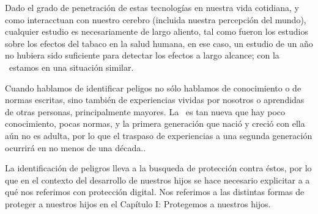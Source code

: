 Dado el grado de penetraci\'on de estas tecnolog\'ias en nuestra vida cotidiana, 
y como interacctuan con nuestro cerebro 
(incluida nuestra percepci\'on del mundo), cualquier estudio
es necesariamente de largo aliento, tal como fueron los estudios sobre
los efectos del tabaco en la salud humana, en ese caso, un estudio de
un a\~no no hubiera sido suficiente para detectar los efectos a largo alcance;
con la \internet\ estamos en una situaci\'on similar.

Cuando hablamos de identificar peligos no s\'olo hablamos de conocimiento
o de normas escritas, sino tambi\'en de experiencias vividas por nosotros 
o aprendidas de otras personas, principalmente mayores. 
La \internet\ es tan nueva que
hay poco conocimiento, pocas normas, y
 la primera generaci\'on que naci\'o
y creci\'o con ella a\'un no es adulta, por lo que el traspaso de experiencias 
a una segunda generaci\'on ocurrir\'a en no menos de una d\'ecada.. 




La identificaci\'on de peligros lleva a la busqueda de protecci\'on
contra \'estos, por lo que en el contexto del desarrollo de nuestros
hijos se hace necesario explicitar a a qu\'e nos referimos con
protecci\'on digital. Nos referimos a las distintas formas de proteger a
nuestros hijos en el Cap\'itulo I: Protegemos a nuestros hijos.

 
